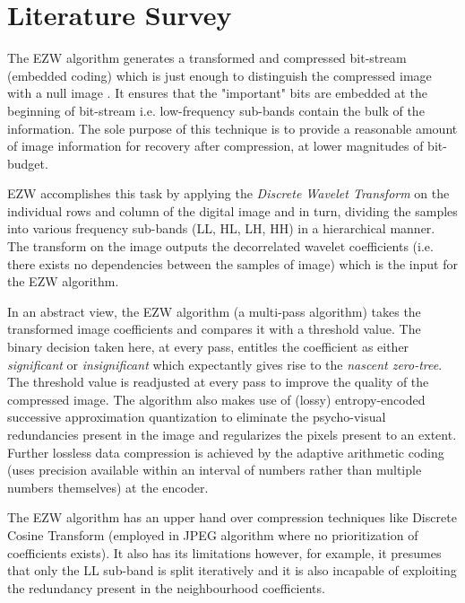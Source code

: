 \documentclass[./A14_Report.tex]{subfiles}
\begin{document}
\chapter{Literature Survey}
The EZW algorithm generates a transformed and compressed bit-stream (embedded
coding) which is just enough to distinguish the compressed image with a null
image \cite{shap1993}. It ensures that the "important" bits are embedded at the
beginning of bit-stream i.e. low-frequency sub-bands contain the bulk of the
information. The sole purpose of this technique is to provide a reasonable
amount of image information for recovery after compression, at lower magnitudes
of bit-budget.

\par

EZW accomplishes this task by applying the \textit{Discrete Wavelet Transform}
on the individual rows and column of the digital image and in turn, dividing
the samples into various frequency sub-bands (LL, HL, LH, HH) in a hierarchical
manner. The transform on the image outputs the decorrelated wavelet
coefficients (i.e. there exists no dependencies between the samples of image)
which is the input for the EZW algorithm.

\par

In an abstract view, the EZW algorithm (a multi-pass algorithm) takes the
transformed image coefficients and compares it with a threshold value. The
binary decision taken here, at every pass, entitles the coefficient as either
\textit{significant} or \textit{insignificant} which expectantly gives rise to
the \textit{nascent zero-tree}. The threshold value is readjusted at every pass
to improve the quality of the compressed image. The algorithm also makes use of
(lossy) entropy-encoded successive approximation quantization to eliminate the
psycho-visual redundancies present in the image and regularizes the pixels
present to an extent. Further lossless data compression is achieved by the
adaptive arithmetic coding (uses precision available within an interval of
numbers rather than multiple numbers themselves) at the encoder.

\par

The EZW algorithm has an upper hand over compression techniques like Discrete
Cosine Transform (employed in JPEG algorithm where no prioritization of
coefficients exists). It also has its limitations however, for example, it
presumes that only the LL sub-band is split iteratively and it is also
incapable of exploiting the redundancy present in the neighbourhood
coefficients.
\end{document}
